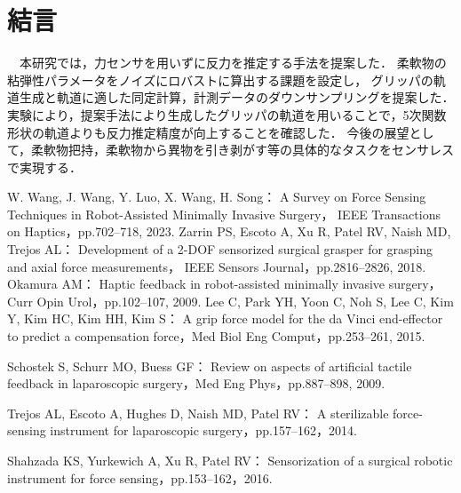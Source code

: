 \documentclass[a4paper]{jarticle}
\begin{document}
\section{結言}
　本研究では，力センサを用いずに反力を推定する手法を提案した．
柔軟物の粘弾性パラメータをノイズにロバストに算出する課題を設定し，
グリッパの軌道生成と軌道に適した同定計算，計測データのダウンサンプリングを提案した．
実験により，提案手法により生成したグリッパの軌道を用いることで，5次関数形状の軌道よりも反力推定精度が向上することを確認した．
今後の展望として，柔軟物把持，柔軟物から異物を引き剥がす等の具体的なタスクをセンサレスで実現する．
\begin{thebibliography}{9}
    \setlength{\itemsep}{0pt} %
    \renewcommand{\baselinestretch}{0.8}\selectfont %
    \setlength{\parskip}{0pt} %

    W. Wang, J. Wang, Y. Luo, X. Wang, H. Song：
    A Survey on Force Sensing Techniques in Robot-Assisted Minimally Invasive Surgery，
    IEEE Transactions on Haptics，pp.702–718, 2023.
    Zarrin PS, Escoto A, Xu R, Patel RV, Naish MD, Trejos AL： 
    Development of a 2-DOF sensorized surgical grasper for grasping and axial force measurements，
    IEEE Sensors Journal，pp.2816–2826, 2018.
    Okamura AM：
    Haptic feedback in robot-assisted minimally invasive surgery，Curr Opin Urol，pp.102–107, 2009.
    Lee C, Park YH, Yoon C, Noh S, Lee C, Kim Y, Kim HC, Kim HH, Kim S：
    A grip force model for the da Vinci end-effector to predict a compensation force，Med Biol Eng Comput，pp.253–261, 2015.

    Schostek S, Schurr MO, Buess GF：
    Review on aspects of artificial tactile feedback in laparoscopic surgery，Med Eng Phys，pp.887–898, 2009.

    
    Trejos AL, Escoto A, Hughes D, Naish MD, Patel RV：
    A sterilizable force-sensing instrument for laparoscopic surgery，pp.157–162，2014.

    Shahzada KS, Yurkewich A, Xu R, Patel RV：
    Sensorization of a surgical robotic instrument for force sensing，pp.153–162，2016.
    

\end{thebibliography}
\end{document}
